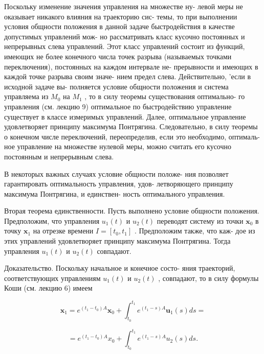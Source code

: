 \documentclass[8pt]{extarticle}
\begin{document}
Поскольку изменение значения управления на множестве ну- левой меры не оказывает никакого влияния на траекторию сис- темы, то при выполнении условия общности положения в данной задаче быстродействия в качестве допустимых управлений мож- но рассматривать класс кусочно постоянных и непрерывных слева управлений. Этот класс управлений состоит из функций, имеющих не более конечного числа точек разрыва (называемых точками переключения), постоянных на каждом интервале не- прерывности и имеющих в каждой точке разрыва своим значе- нием предел слева. Действительно, 'если в исходной задаче вы- полняется условие общности положения и система управляема из \({M}_{0}\) на \({M}_{1}\) , то в силу теоремы существования оптимально- го управления (см. лекцию 9) оптимальное по быстродействию управление существует в классе измеримых управлений. Далее, оптимальное управление удовлетворяет принципу максимума Понтрягина. Следовательно, в силу теоремы о конечном числе переключений, переопределив, если это необходимо, оптималь- ное управление на множестве нулевой меры, можно считать его кусочно постоянным и непрерывным слева.

В некоторых важных случаях условие общности положе- ния позволяет гарантировать оптимальность управления, удов- летворяющего принципу максимума Понтрягина, и единствен- ность оптимального управления.

Вторая теорема единственности. Пусть выполнено условие общности положения. Предположим, что управления \({u}_{1}\left( t\right)\) и \({u}_{2}\left( t\right)\) переводят систему из точки \({\mathbf{x}}_{0}\) в точку \({\mathbf{x}}_{1}\) на отрезке времени \(I = \left\lbrack  {{t}_{0},{t}_{1}}\right\rbrack\) . Предположим также, что каж- дое из этих управлений удовлетворяет принципу максимума Понтрягина. Тогда управления \({u}_{1}\left( t\right)\) и \({u}_{2}\left( t\right)\) совпадают.

Доказательство. Поскольку начальное и конечное состо- яния траекторий, соответствующих управлениям \({u}_{1}\left( t\right)\) и \({u}_{2}\left( t\right)\) , совпадают, то в силу формулы Коши (см. лекцию 6) имеем

\[
{\mathbf{x}}_{1} = {e}^{\left( {{t}_{1} - {t}_{0}}\right) A}{\mathbf{x}}_{0} + {\int }_{{t}_{0}}^{{t}_{1}}{e}^{\left( {{t}_{1} - s}\right) A}{\mathbf{u}}_{1}\left( s\right) {ds} =
\]

\[
= {e}^{\left( {{t}_{1} - {t}_{0}}\right) A}{x}_{0} + {\int }_{{t}_{0}}^{{t}_{1}}{e}^{\left( {{t}_{1} - s}\right) A}{u}_{2}\left( s\right) {ds}.
\]
\end{document}

